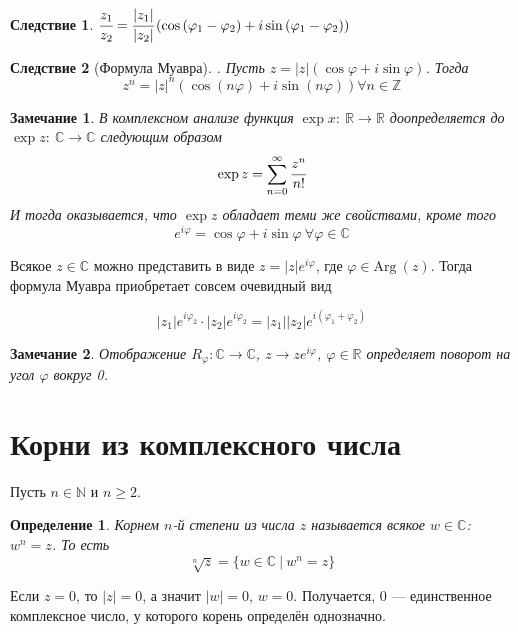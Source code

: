 \documentclass[a4paper,12pt]{article}
\newtheorem*{Def}{Определение}
\newtheorem*{Comment}{Замечание}
\newtheorem*{Consequence}{Следствие}
\newcommand{\Arg}{\mathrm{Arg\:}}
\begin{document}
\begin{Consequence}
$\cfrac{z_1}{z_2} = \cfrac{|z_1|}{|z_2|}\left(\cos\left(\varphi_1-\varphi_2\right) + i\sin\left(\varphi_1 - \varphi_2\right)\right)$
\end{Consequence}

\begin{Consequence}
[Формула Муавра]. Пусть $z = |z|\left(\cos\varphi + i \sin \varphi\right)$. Тогда
\[z^n = |z|^n\left(\cos\left(n\varphi\right)+i\sin\left(n\varphi\right)\right) \forall n \in \mathbb{Z}
\]
\end{Consequence}

\begin{Comment}
В комплексном анализе функция $\exp x\colon\ \mathbb{R} \rightarrow \mathbb{R}$ доопределяется до $\exp z\colon \ \mathbb{C} \rightarrow \mathbb{C}$ следующим образом
\[
\exp z =\sum\limits_{n=0}^{\infty}\cfrac{z^n}{n!}
\]
И тогда оказывается, что $\exp z$ обладает теми же свойствами, кроме того
\[
e^{i\varphi} = \cos\varphi + i\sin\varphi\ \forall \varphi \in \mathbb{C}
\]
\end{Comment}

Всякое $z \in \mathbb{C}$ можно представить в виде $z = |z|e^{i\varphi}$, где $\varphi \in \Arg\left(z\right)$. Тогда формула Муавра приобретает совсем очевидный вид

\[
|z_1|e^{i\varphi_2}\cdot|z_2|e^{i\varphi_2} = |z_1||z_2|e^{i\left(\varphi_1+\varphi_2\right)}
\]

\begin{Comment}
Отображение $R_\varphi \colon \mathbb{C}\rightarrow\mathbb{C}$, $z\rightarrow ze^{i\varphi}$, $\varphi \in \mathbb{R}$ определяет поворот на угол $\varphi$ вокруг 0.
\end{Comment}

\section*{Корни из комплексного числа}

Пусть $n\in\mathbb N$ и $n\geqslant2$.

\begin{Def}
Корнем $n$-й степени из числа $z$ называется всякое $w\in\mathbb C$: $w^n=z$. То есть
\[
\sqrt[n]{z} = \{w\in\mathbb C\ |\ w^n = z\}
\]
\end{Def}

Если $z=0$, то $|z| = 0$, а значит $|w| = 0$, $w=0$. Получается, 0 --- единственное комплексное число, у которого корень определён однозначно. 
\end{document}

